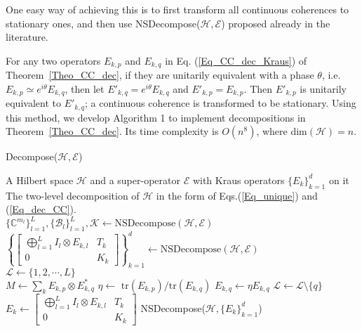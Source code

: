 \documentclass[journal]{IEEEtran}
\def\h{\ensuremath{\mathcal{H}}}
\def\l{\ensuremath{\mathcal{L}}}
\def\k{\ensuremath{\mathcal{K}}}
\def\b{\ensuremath{\mathcal{B}}}
\def\e{\ensuremath{\mathcal{E}}}
\def\l{\ensuremath{\mathcal{L}}}
\def\l{\mathcal{L}}
\def\k{\mathcal{K}}
\begin{document}
One easy way of achieving this is to first transform all continuous coherences to stationary ones, and then use NSDecompose($\h,\e$) proposed already in the literature. 

For any two operators $E_{k,p}$ and $E_{k,q}$ in Eq. (\ref{Eq_CC_dec_Kraus}) of Theorem~\ref{Theo_CC_dec}, if they are unitarily equivalent with a phase $\theta$, i.e. $E_{k,p}\simeq e^{i\theta}E_{k,q}$, then 
 let $E'_{k,q}=e^{i\theta}E_{k,q}$ and $E'_{k,p}=E_{k,p}$. Then $E'_{k,p}$ is unitarily equivalent to $E'_{k,q}$; a continuous coherence is transformed to be stationary. Using this method, we develop Algorithm 1 to implement decompositions in Theorem~\ref{Theo_CC_dec}. Its time complexity is $O(n^8)$, where dim$(\h)=n.$ 
 \begin{algorithm}
\caption{Decompose($\h,\e$)}
\label{Irreducibility}
\begin{algorithmic}
\REQUIRE A Hilbert space $\h$ and a super-operator $\e$ with Kraus operators $\{E_{k}\}_{k=1}^{d}$ on it \\
\ENSURE The two-level decomposition of $\h$ in the form of Eqs.(\ref{Eq_unique}) and (\ref{Eq_dec_CC}). \\

\STATE 
$\{\mathbb{C}^{m_l}\}_{l=1}^L, \{\b_l\}_{l=1}^{L}, \k \leftarrow\textrm{NSDecompose}(\h,\e)$\\
\STATE $\left\{\left[\begin{matrix}
  \bigoplus_{l=1}^{L} I_{l}\otimes E_{k,l} & T_k\\
0&K_k
\end{matrix}\right]\right\}_{k=1}^{d}\leftarrow\textrm{NSDecompose}(\h,\e)$ \\

\STATE $\l\leftarrow \{1,2,\cdots,L\}$\\
\IF{$p\in \l$}
\FOR{each $q\leftarrow p+1 \textrm{ to }L$ with $q\in \l$}
\STATE$M\leftarrow\sum_{k}E_{k,p}\otimes E_{k,q}^{*}$
\STATE $\eta\leftarrow$ $\textrm{tr}(E_{k,p})/\textrm{tr}(E_{k,q})$  
\STATE $E_{k,q}\leftarrow \eta E_{k,q}$
\STATE $\l\leftarrow \l\setminus\{q\}$
\ENDIF
\ENDFOR
\ENDIF
\ENDFOR
{}
\STATE $E_k\leftarrow\left[\begin{matrix}
  \bigoplus_{l=1}^{L} I_{l}\otimes E_{k,l} & T_k\\
0&K_k
\end{matrix}\right]$ 
\ENDFOR
\RETURN NSDecompose($\h,\{E_{k}\}_{k=1}^d$)
\end{algorithmic}
\end{algorithm}
\end{document}
